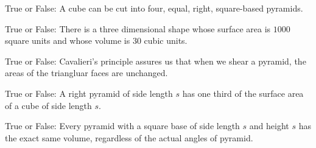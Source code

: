\documentclass[noauthor,nooutcomes]{ximera}
\author{Bart Snapp}
\begin{document}
\maketitle


\begin{exercise}
  True or False: A cube can be cut into four, equal, right,
  square-based pyramids.
\end{exercise}

\begin{exercise}
 True or False: There is a three dimensional shape whose surface area
 is $1000$ square units and whose volume is $30$ cubic units.
\end{exercise}

\begin{exercise}
  True or False: Cavalieri's principle assures us that when we shear a
  pyramid, the areas of the triangluar faces are unchanged.
\end{exercise}


\begin{exercise}
  True or False: A right pyramid of side length $s$ has one third of
  the surface area of a cube of side length $s$.
\end{exercise}

\begin{exercise}
  True or False: Every pyramid with a square base of side length $s$ and
  height $s$ has the exact same volume, regardless of the actual angles of pyramid.
\end{exercise}

\end{document}

